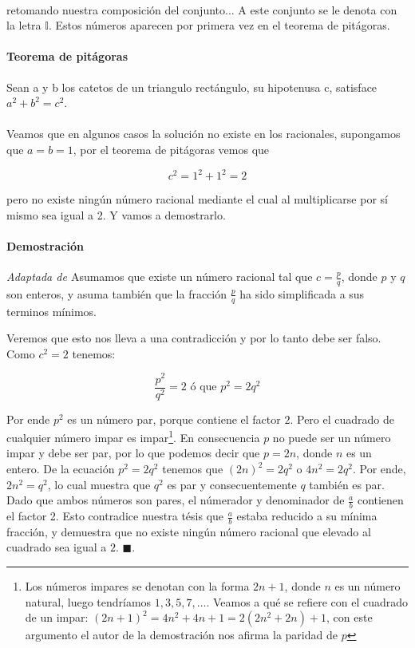 \documentclass{article}
\begin{document}
\paragraph{} retomando nuestra composición del conjunto... A este conjunto se le denota con la letra $\mathbb{I}$. Estos números aparecen por primera vez en el teorema de pitágoras.

\paragraph{Teorema de pitágoras} Sean a y b los catetos de un triangulo rectángulo, su hipotenusa c, satisface $a^2 + b^2 = c^2$.

\paragraph{} Veamos que en algunos casos la solución no existe en los racionales, supongamos que $a = b = 1$, por el teorema de pitágoras vemos que

$$c^2 = 1^2 + 1^2 = 2$$

pero no existe ningún número racional mediante el cual al multiplicarse por sí mismo sea igual a 2. Y vamos a demostrarlo.

\paragraph{Demostración} \textit{Adaptada de \cite{brink_1933}} Asumamos que existe un número racional tal que $c = \frac{p}{q}$, donde $p$ y $q$ son enteros, y asuma también que la fracción $\frac{p}{q}$ ha sido simplificada a sus terminos mínimos.

Veremos que esto nos lleva a una contradicción y por lo tanto debe ser falso. Como $c^2 = 2$ tenemos:

$$\frac{p^2}{q^2} = 2 \text{ ó que } p^2 = 2q^2$$

Por ende $p^2$ es un número par, porque contiene el factor $2$. Pero el cuadrado de cualquier número impar es impar\footnote{Los números impares se denotan con la forma $2n + 1$, donde $n$ es un número natural, luego tendríamos $1, 3, 5, 7, \dots$. Veamos a qué se refiere con el cuadrado de un impar: $(2n+1)^2 = 4n^2 + 4n + 1 = 2(2n^2 + 2n) +1$, con este argumento el autor de la demostración nos afirma la paridad de $p$}. En consecuencia $p$ no puede ser un número impar y debe ser par, por lo que podemos decir que $p = 2n$, donde $n$ es un entero. De la ecuación $p^2 = 2q^2$ tenemos que $(2n)^2 = 2q^2$ o $4n^2 = 2q^2$. Por ende, $2n^2 = q^2$, lo cual muestra que $q^2$ es par y consecuentemente $q$ también es par. Dado que ambos números son pares, el númerador y denominador de $\frac{a}{b}$ contienen el factor 2. Esto contradice nuestra tésis que $\frac{a}{b}$ estaba reducido a su mínima fracción, y demuestra que no existe ningún número racional que elevado al cuadrado sea igual a $2$. $\blacksquare$.
\end{document}
